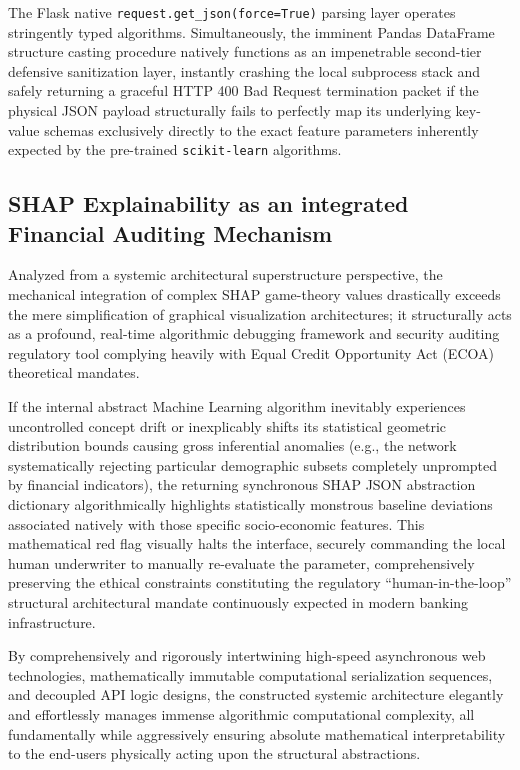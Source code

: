 The Flask native \texttt{request.get\_json(force=True)} parsing layer
operates stringently typed algorithms. Simultaneously, the imminent
Pandas DataFrame structure casting procedure natively functions as an
impenetrable second-tier defensive sanitization layer, instantly
crashing the local subprocess stack and safely returning a graceful HTTP
400 Bad Request termination packet if the physical JSON payload
structurally fails to perfectly map its underlying key-value schemas
exclusively directly to the exact feature parameters inherently expected
by the pre-trained \texttt{scikit-learn} algorithms.

\hypertarget{shap-explainability-as-an-integrated-financial-auditing-mechanism}{%
\subsection{SHAP Explainability as an integrated Financial Auditing
Mechanism}\label{shap-explainability-as-an-integrated-financial-auditing-mechanism}}

Analyzed from a systemic architectural superstructure perspective, the
mechanical integration of complex SHAP game-theory values drastically
exceeds the mere simplification of graphical visualization
architectures; it structurally acts as a profound, real-time algorithmic
debugging framework and security auditing regulatory tool complying
heavily with Equal Credit Opportunity Act (ECOA) theoretical mandates.

If the internal abstract Machine Learning algorithm inevitably
experiences uncontrolled concept drift or inexplicably shifts its
statistical geometric distribution bounds causing gross inferential
anomalies (e.g., the network systematically rejecting particular
demographic subsets completely unprompted by financial indicators), the
returning synchronous SHAP JSON abstraction dictionary algorithmically
highlights statistically monstrous baseline deviations associated
natively with those specific socio-economic features. This mathematical
red flag visually halts the interface, securely commanding the local
human underwriter to manually re-evaluate the parameter, comprehensively
preserving the ethical constraints constituting the regulatory
``human-in-the-loop'' structural architectural mandate continuously
expected in modern banking infrastructure.

By comprehensively and rigorously intertwining high-speed asynchronous
web technologies, mathematically immutable computational serialization
sequences, and decoupled API logic designs, the constructed systemic
architecture elegantly and effortlessly manages immense algorithmic
computational complexity, all fundamentally while aggressively ensuring
absolute mathematical interpretability to the end-users physically
acting upon the structural abstractions.

